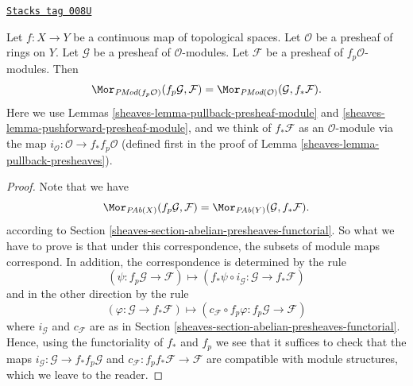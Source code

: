 \begin{lemma}
\label{sheaves-lemma-adjoint-push-pull-presheaves-modules}
\href{https://stacks.math.columbia.edu/tag/008U}{\texttt{Stacks tag 008U}}

Let $f : X \to Y$ be a continuous map of topological spaces.
Let $\mathcal{O}$ be a presheaf of rings on $Y$.
Let $\mathcal{G}$ be a presheaf of $\mathcal{O}$-modules.
Let $\mathcal{F}$ be a presheaf of $f_p\mathcal{O}$-modules.
Then
$$
\Mor_{\textit{PMod}(f_p\mathcal{O})}(f_p\mathcal{G}, \mathcal{F})
=
\Mor_{\textit{PMod}(\mathcal{O})}(\mathcal{G}, f_*\mathcal{F}).
$$
Here we use
Lemmas \ref{sheaves-lemma-pullback-presheaf-module}
and \ref{sheaves-lemma-pushforward-presheaf-module}, and we think of
$f_*\mathcal{F}$ as an $\mathcal{O}$-module via the map
$i_\mathcal{O} : \mathcal{O} \to f_*f_p\mathcal{O}$
(defined first in the proof of Lemma \ref{sheaves-lemma-pullback-presheaves}).
\end{lemma}

\begin{proof}
Note that we have
$$
\Mor_{\textit{PAb}(X)}(f_p\mathcal{G}, \mathcal{F})
=
\Mor_{\textit{PAb}(Y)}(\mathcal{G}, f_*\mathcal{F}).
$$
according to Section \ref{sheaves-section-abelian-presheaves-functorial}.
So what we have to prove is that under this correspondence, the
subsets of module maps correspond. In addition, the correspondence
is determined by the rule
$$
(\psi : f_p\mathcal{G} \to \mathcal{F})
\longmapsto
(f_*\psi \circ i_\mathcal{G} :
\mathcal{G} \to f_* \mathcal{F})
$$
and in the other direction by the rule
$$
(\varphi : \mathcal{G} \to f_* \mathcal{F})
\longmapsto
(c_\mathcal{F} \circ f_p\varphi : f_p\mathcal{G} \to \mathcal{F})
$$
where $i_\mathcal{G}$ and $c_\mathcal{F}$ are as in
Section \ref{sheaves-section-abelian-presheaves-functorial}.
Hence, using the functoriality of $f_*$ and $f_p$ we see that
it suffices to check that the maps
$i_\mathcal{G} : \mathcal{G} \to f_* f_p \mathcal{G}$ and
$c_\mathcal{F} : f_p f_* \mathcal{F} \to \mathcal{F}$
are compatible with module structures, which we leave to the reader.
\end{proof}

